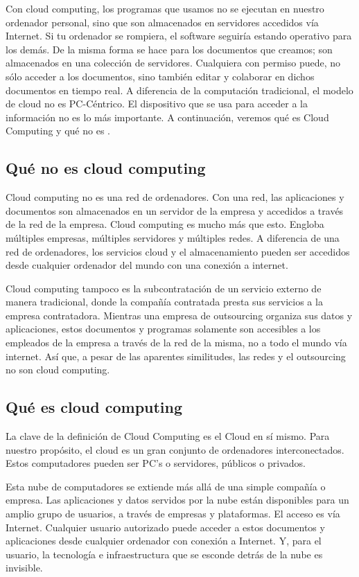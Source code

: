 \documentclass[runningheads]{llncs}
\begin{document}
Con cloud computing, los programas que usamos no se ejecutan en nuestro ordenador personal, sino que son almacenados en servidores 
accedidos vía Internet. Si tu ordenador se rompiera, el software seguiría estando operativo para los demás. De la misma forma se hace 
para los documentos que creamos; son almacenados en una colección de servidores. Cualquiera con permiso puede, no sólo acceder a los 
documentos, sino también editar y colaborar en dichos documentos en tiempo real. A diferencia de la computación tradicional, el modelo 
de cloud no es PC-Céntrico. El dispositivo que se usa para acceder a la información no es lo más importante. A continuación, veremos 
qué es Cloud Computing y qué no es \cite{Web08} .

\subsection{Qué no es cloud computing}

Cloud computing no es una red de ordenadores. Con una red, las aplicaciones  y documentos son almacenados en un servidor de la empresa 
y accedidos a través de la red de la empresa. Cloud computing es mucho más que esto. Engloba múltiples empresas, múltiples servidores y 
múltiples redes. A diferencia de una red de ordenadores, los servicios cloud y el almacenamiento pueden ser accedidos desde cualquier 
ordenador del mundo con una conexión a internet. 

Cloud computing tampoco es la subcontratación de un servicio externo de manera tradicional, donde la compañía contratada presta sus 
servicios a la empresa contratadora. Mientras una empresa de outsourcing organiza sus datos y aplicaciones, estos documentos y 
programas solamente son accesibles a los empleados de la empresa a través de la red de la misma, no a todo el mundo vía internet.
Así que, a pesar de las aparentes similitudes, las redes y el outsourcing no son cloud computing.


\subsection{Qué es cloud computing}

La clave de la definición de Cloud Computing es el Cloud en sí mismo. Para nuestro propósito, el cloud es un gran conjunto de ordenadores 
interconectados. Estos computadores pueden ser PC's o servidores, públicos o privados. 

Esta nube de computadores se extiende más allá de una simple compañía o empresa. Las aplicaciones y datos servidos por la nube están 
disponibles para un amplio grupo de usuarios, a través de empresas y plataformas. El acceso es vía Internet. Cualquier usuario autorizado 
puede acceder a estos documentos  y aplicaciones  desde cualquier ordenador con conexión a Internet. Y, para el usuario, la tecnología e 
infraestructura que se esconde detrás de la nube es invisible. 
\end{document}
